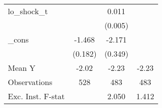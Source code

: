 {\begin{tabular}{l*{3}{c}}
\addlinespace
lo\_shock\_t  &                     &       0.011\sym{**} &                     \\
            &                     &     (0.005)         &                     \\
\addlinespace
\_cons      &      -1.468\sym{***}&      -2.171\sym{***}&                     \\
            &     (0.182)         &     (0.349)         &                     \\
\midrule
Mean Y      &       -2.02         &       -2.23         &       -2.23         \\
Observations&         528         &         483         &         483         \\
Exc. Inst. F-stat&                     &       2.050         &       1.412         \\
\bottomrule
\end{tabular}
}

